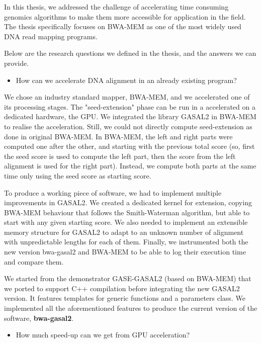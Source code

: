 

In this thesis, we addressed the challenge of accelerating time consuming genomics algorithms to make them more accessible for application in the field. The thesis specifically focuses on BWA-MEM as one of the most widely used DNA read mapping programs. 

Below are the research questions we defined in the thesis, and the answers we can provide.

\begin{itemize}
	\item How can we accelerate DNA alignment in an already existing program?
\end{itemize}	

We chose an industry standard mapper, BWA-MEM, and we accelerated one of its processing stages. The "seed-extension" phase can be run in a accelerated on a dedicated hardware, the GPU. We integrated the library GASAL2 in BWA-MEM to realise the acceleration. Still, we could not directly compute seed-extension as done in original BWA-MEM. In BWA-MEM, the left and right parts were computed one after the other, and starting with the previous total score (so, first the seed score is used to compute the left part, then the score from the left alignment is used for the right part). Instead, we compute both parts at the same time only using the seed score as starting score.

To produce a working piece of software, we had to implement multiple improvements in GASAL2. We created a dedicated kernel for extension, copying BWA-MEM behaviour that follows the Smith-Waterman algorithm, but able to start with any given starting score. We also needed to implement an extensible memory structure for GASAL2 to adapt to an unknown number of alignment with unpredictable lengths for each of them. Finally, we instrumented both the new version bwa-gasal2 and BWA-MEM to be able to log their execution time and compare them. 

We started from the demonstrator GASE-GASAL2 (based on BWA-MEM) that we ported to support C++ compilation before integrating the new GASAL2 version. It features templates for generic functions and a parameters class. We implemented all the aforementioned features to produce the current version of the software, \textbf{bwa-gasal2}.

\begin{itemize}
	\item How much speed-up can we get from GPU acceleration?
\end{itemize}

